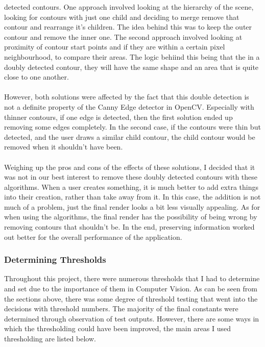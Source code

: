 \documentclass[11pt]{article}
\begin{document}
detected contours. One approach involved looking at the hierarchy 
of the scene, looking for contours with just one child and deciding to
merge remove that contour and rearrange it's children. The idea
behind this was to keep the outer contour and remove the inner one. 
The second approach involved looking at proximity of contour start points
and if they are within a certain pixel neighbourhood, to compare their areas.
The logic behiind this being that the in a doubly detected contour, they
will have the same shape and an area that is quite close to one another. \\
\\
However, both solutions were affected by the fact that this double detection
is not a definite property of the Canny Edge detector in OpenCV. Especially
with thinner contours, if one edge is detected, then the first solution
ended up removing some edges completely. In the second case, if the 
contours were thin but detected, and the user draws a similar child contour,
the child contour would be removed when it shouldn't have been.\\
\\
Weighing up the pros and cons of the effects of these solutions, I 
decided that it was not in our best interest to remove these doubly 
detected contours with these algorithms. When a user creates something,
it is much better to add extra things into their creation, rather than
take away from it. In this case, the addition is not much of a problem,
just the final render looks a bit less visually appealing. As for when 
using the algorithms, the final render has the possibility of being
wrong by removing contours that shouldn't be. In the end, preserving
information worked out better for the overall performance of the application.

\subsubsection{Determining Thresholds}
Throughout this project, there were numerous thresholds that I had to 
determine and set due to the importance of them in Computer Vision. 
As can be seen from the sections above, there was some degree of 
threshold testing that went into the decisions with threshold numbers.
The majority of the final constants were determined through observation
of test outputs. However, there are some ways in which the thresholding
could have been improved, the main areas I used thresholding are listed below.\\
\end{document}

